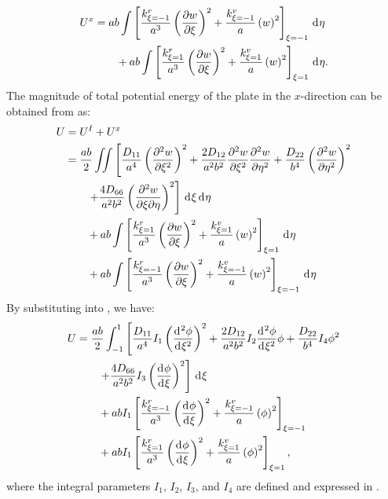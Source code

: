 \documentclass[preprint,12pt]{elsarticle}
\newcommand{\id}{\mathrm{d}\mkern1mu}
\begin{document}
%
\begin{equation}\label{eq:poten_energy_edgex2}
	\begin{split}
		U^{x} &= ab \int\left[\frac{k^r_{\xi=-1}}{a^3} \left( \frac{\partial w}{\partial \xi} \right)^2 + \frac{k^v_{\xi=-1}}{a} \left( w \right)^2\right]_{\xi=-1} \, \id \eta \\
		&\qquad + ab \int\left[\frac{k^r_{\xi=1}}{a^3} \left( \frac{\partial w}{\partial \xi} \right)^2 + \frac{k^v_{\xi=1}}{a} \left( w \right)^2\right]_{\xi=1} \, \id \eta.
	\end{split}
\end{equation}
%
The magnitude of total potential energy of the plate in the $x$-direction can be obtained from  as:
%
\begin{equation}\label{eq:poten_energy_tolx}
	\begin{split}
		U &= U^{I} + U^{x} \\
		&= \frac{ab}{2} \iint \left[ \frac{D_{11}}{a^4} \left( \frac{\partial^2 w}{\partial \xi^2} \right)^2 + \frac{2 D_{12}}{a^2 b^2} \frac{\partial^2 w}{\partial \xi^2} \frac{\partial^2 w}{\partial \eta^2} + \frac{D_{22}}{b^4} \left( \frac{\partial^2 w}{\partial \eta^2} \right)^2 \right. \\
		&\qquad \left.  + \frac{4 D_{66}}{a^2 b^2} \left( \frac{\partial^2 w}{\partial \xi \partial \eta} \right)^2 \right] \, \id\xi \, \id\eta \\
		&\qquad + ab \int \left[\frac{k^r_{\xi=1}}{a^3} \left( \frac{\partial w}{\partial \xi} \right)^2 + \frac{k^v_{\xi=1}}{a} \left( w \right)^2 \right]_{\xi=1} \, \id \eta \\
		&\qquad + ab \int \left[\frac{k^r_{\xi=-1}}{a^3} \left( \frac{\partial w}{\partial \xi} \right)^2 + \frac{k^v_{\xi=-1}}{a} \left( w \right)^2 \right]_{\xi=-1} \, \id \eta
	\end{split}
\end{equation}
%
By substituting  into , we have:
%
\begin{equation}\label{eq:poten_energy_tolx2}
	\begin{split}
		U&=\frac{ab}{2} \int_{-1}^{1} \left[ \frac{D_{11}}{a^4}I_1 \left( \frac{\id^2\phi }{\id \xi^2} \right)^2 + \frac{2 D_{12}}{a^2 b^2}I_2 \frac{\id^2\phi }{\id \xi^2}\phi  + \frac{D_{22}}{b^4}I_4  \phi^2 \right. \\
		&\qquad \left. + \frac{4 D_{66}}{a^2 b^2}I_3 \left( \frac{\id \phi }{\id \xi}\right)^2 \right] \, \id\xi \\
		&\qquad + abI_1 \left[\frac{k^r_{\xi=-1}}{a^3} \left( \frac{\id \phi}{\id \xi} \right)^2+ \frac{k^v_{\xi=-1}}{a} \left( \phi \right)^2\right]_{\xi=-1}\\
		&\qquad + abI_1 \left[\frac{k^r_{\xi=1}}{a^3} \left( \frac{\id \phi}{\id \xi} \right)^2+ \frac{k^v_{\xi=1}}{a} \left( \phi \right)^2\right]_{\xi=1},
	\end{split}
\end{equation}
%
where the integral parameters $I_1$, $I_2$, $I_3$, and $ I_4$ are defined and expressed in .
\end{document}
